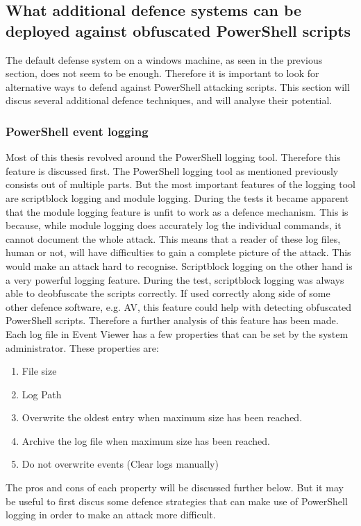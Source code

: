 \documentclass{article}%
\begin{document}
\newpage
\subsection{What additional defence systems can be deployed against obfuscated PowerShell scripts}
The default defense system on a windows machine, as seen in the previous section, does not seem to be enough. Therefore it is important to look for alternative ways to defend against PowerShell attacking scripts. This section will discus several additional defence techniques, and will analyse their potential.
\subsubsection{PowerShell event logging}
Most of this thesis revolved around the PowerShell logging tool. Therefore this feature is discussed first. The PowerShell logging tool as mentioned previously consists out of multiple parts. But the most important features of the logging tool are scriptblock logging and module logging. During the tests it became apparent that the module logging feature is unfit to work as a defence mechanism. This is because, while module logging does accurately log the individual commands, it cannot document the whole attack. This means that a reader of these log files, human or not, will have difficulties to gain a complete picture of the attack. This would make an attack hard to recognise. Scriptblock logging on the other hand is a very powerful logging feature. During the test, scriptblock logging was always able to deobfuscate the scripts correctly. If used correctly along side of some other defence software, e.g. AV, this feature could help with detecting obfuscated PowerShell scripts. Therefore a further analysis of this feature has been made.
Each log file in Event Viewer has a few properties that can be set by the system administrator. These properties are:
\begin{enumerate}
	\item File size
	\item Log Path
	\item Overwrite the oldest entry when maximum size has been reached.
	\item Archive the log file when maximum size has been reached.
	\item Do not overwrite events (Clear logs manually)
\end{enumerate}
The pros and cons of each property will be discussed further below. But it may be useful to first discus some defence strategies that can make use of PowerShell logging in order to make an attack more difficult.
\end{document}
